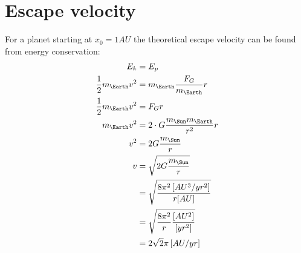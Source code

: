 \documentclass{article}
\begin{document}
\section*{Escape velocity}
For a planet starting at $x_0 = 1AU$ the theoretical escape velocity\cite{carroll} can be found from energy conservation:
\begin{align*}
  E_k &= E_p\\
  \frac{1}{2}m_{\Earth}v^2 &= m_{\Earth}\frac{F_G}{m_{\Earth}}r\\
  \frac{1}{2}m_{\Earth}v^2 &= F_G r\\
  m_{\Earth}v^2 &= 2\cdot G\frac{m_{\Sun}m_{\Earth}}{r^2} r\\
  v^2 &= 2G\frac{m_{\Sun}}{r}\\
  v &= \sqrt{2G\frac{m_{\Sun}}{r}}\\
  &= \sqrt{\frac{8\pi^2\left[AU^3/yr^2\right]}{r[AU]}}\\
  &= \sqrt{\frac{8\pi^2}{r}\frac{[AU^2]}{[yr^2]}}\\
  &= 2\sqrt{2}\pi\left[AU/yr\right]\\
\end{align*}
\end{document}
